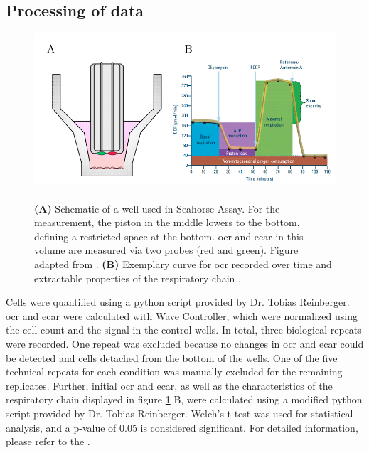    \subsection{Processing of data}
    \begin{figure}[h]
    \capstart
        \centering
        \includegraphics{Abbildung/seahorse_basics_placeholder.pdf}

        \begin{minipage}{\captionwidth}
            \caption[enrichment]{\\
            \textbf{(A)} Schematic of a well used in Seahorse Assay. For the measurement, the piston in the middle lowers to the bottom, defining a restricted space at the bottom. \ac{ocr} and \ac{ecar} in this volume are measured via two probes (red and green). Figure adapted from \cite{agilenttechnologiesincHowAgilentSeahorse2022}. \textbf{(B)} Exemplary curve for \ac{ocr} recorded over time and extractable properties of the respiratory chain \cite{agilenttechnologiesinc.AGILENTSeahorseXF2020}.}
            \label{fig:seahorse_basics}
        \end{minipage}
    \end{figure}

    Cells were quantified using a python script provided by Dr. Tobias Reinberger. \ac{ocr} and \ac{ecar} were calculated with Wave Controller, which were normalized using the cell count and the signal in the control wells. In total, three biological repeats were recorded. One repeat was excluded because no changes in \ac{ocr} and \ac{ecar} could be detected and cells detached from the bottom of the wells. One of the five technical repeats for each condition was manually excluded for the remaining replicates. Further, initial \ac{ocr} and \ac{ecar}, as well as the characteristics of the respiratory chain displayed in figure \ref{fig:seahorse_basics} B, were calculated using a modified python script provided by Dr. Tobias Reinberger. Welch’s t-test was used for statistical analysis, and a p-value of 0.05 is considered significant. For detailed information, please refer to the .

